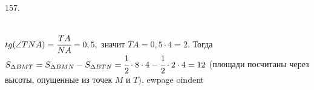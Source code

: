 157. \begin{figure}[ht!]
\end{figure}\\
$tg(\angle TNA)=\cfrac{TA}{NA}=0,5,$ значит $TA=0,5\cdot4=2.$ Тогда $S_{\Delta BMT}=S_{\Delta BMN}-S_{\Delta BTN}=\cfrac{1}{2}\cdot8\cdot4-\cfrac{1}{2}\cdot2\cdot4=12$ (площади посчитаны через высоты, опущенные из точек $M$ и $T$).
ewpage
oindent

